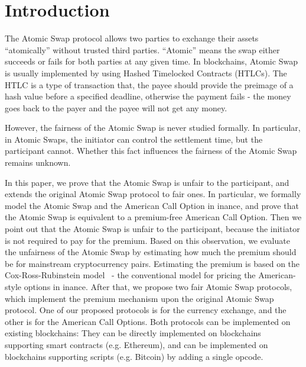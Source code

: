 \section{Introduction}
\label{sec:intro}

The Atomic Swap protocol allows two parties to exchange their assets ``atomically'' without trusted third parties.
``Atomic'' means the swap either succeeds or fails for both parties at any given time.
In blockchains, Atomic Swap is usually implemented by using Hashed Timelocked Contracts (HTLCs).
The HTLC is a type of transaction that, the payee should provide the preimage of a hash value before a specified deadline, otherwise the payment fails - the money goes back to the payer and the payee will not get any money.

However, the fairness of the Atomic Swap is never studied formally.
In particular, in Atomic Swaps, the initiator can control the settlement time, but the participant cannot.
Whether this fact influences the fairness of the Atomic Swap remains unknown.

In this paper, we prove that the Atomic Swap is unfair to the participant, and extends the original Atomic Swap protocol to fair ones.
In particular, we formally model the Atomic Swap and the American Call Option in inance,
and prove that the Atomic Swap is equivalent to a premium-free American Call Option.
Then we point out that the Atomic Swap is unfair to the participant, because the initiator is not required to pay for the premium.
Based on this observation, we evaluate the unfairness of the Atomic Swap by estimating how much the premium should be for mainstream cryptocurrency pairs.
Estimating the premium is based on the Cox-Ross-Rubinstein model~\cite{cox1979option} - the conventional model for pricing the American-style options in inance.
After that, we propose two fair Atomic Swap protocols, which implement the premium mechanism upon the original Atomic Swap protocol.
One of our proposed protocols is for the currency exchange, and the other is for the American Call Options.
Both protocols can be implemented on existing blockchains: 
They can be directly implemented on blockchains supporting smart contracts (e.g. Ethereum),
and can be implemented on blockchains supporting scripts (e.g. Bitcoin) by adding a single opcode.

